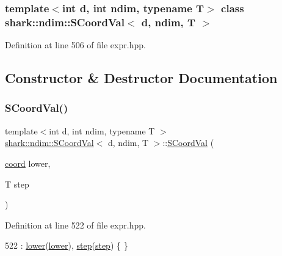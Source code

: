 \subsubsection*{template$<$int d, int ndim, typename T$>$\newline
class shark\+::ndim\+::\+S\+Coord\+Val$<$ d, ndim, T $>$}



Definition at line 506 of file expr.\+hpp.



\subsection{Constructor \& Destructor Documentation}
\hypertarget{classshark_1_1ndim_1_1_s_coord_val_affad44c0ca1502ee2c63dd555a84a4ab}{}\label{classshark_1_1ndim_1_1_s_coord_val_affad44c0ca1502ee2c63dd555a84a4ab} 
\subsubsection{\texorpdfstring{S\+Coord\+Val()}{SCoordVal()}}
{\footnotesize\ttfamily template$<$int d, int ndim, typename T $>$ \\
\hyperlink{classshark_1_1ndim_1_1_s_coord_val}{shark\+::ndim\+::\+S\+Coord\+Val}$<$ d, ndim, T $>$\+::\hyperlink{classshark_1_1ndim_1_1_s_coord_val}{S\+Coord\+Val} (\begin{DoxyParamCaption}\item[{\hyperlink{namespaceshark_a767a92d5dd82cb82266473bff42fa6d9}{coord}}]{lower,  }\item[{T}]{step }\end{DoxyParamCaption})}



Definition at line 522 of file expr.\+hpp.


\begin{DoxyCode}
522 : \hyperlink{classshark_1_1ndim_1_1_s_coord_val_a11ff11a433e0b0cfb8b5de96b3583eb2}{lower}(\hyperlink{classshark_1_1ndim_1_1_s_coord_val_a11ff11a433e0b0cfb8b5de96b3583eb2}{lower}), \hyperlink{classshark_1_1ndim_1_1_s_coord_val_afd74ad2086b0e8c5bab9ee5906ec08fa}{step}(\hyperlink{classshark_1_1ndim_1_1_s_coord_val_afd74ad2086b0e8c5bab9ee5906ec08fa}{step}) \{ \}
\end{DoxyCode}
\hypertarget{classshark_1_1ndim_1_1_s_coord_val_aac1792753976c8339c7430550fd88bea}{}\label{classshark_1_1ndim_1_1_s_coord_val_aac1792753976c8339c7430550fd88bea} 
